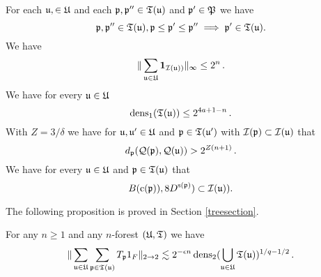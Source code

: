 For each $\mathfrak u, \in \mathfrak U$ and each $\mathfrak p,\mathfrak p''\in \mathfrak T(\mathfrak u)$ and $\mathfrak p'\in \mathfrak P$
we have
\begin{equation}\label{forest2}
    \mathfrak p, \mathfrak p'' \in \mathfrak{T}(\mathfrak u), \mathfrak p \leq \mathfrak p' \leq \mathfrak p'' \implies \mathfrak p' \in \mathfrak{T}(\mathfrak u).
\end{equation}
We have
\begin{equation}\label{forest3}
    \|\sum_{\mathfrak u\in \mathfrak U} \mathbf{1}_{\mathcal{I}(\mathfrak u))}\|_\infty \leq 2^n\,.
\end{equation}
We have for every $\mathfrak u\in \mathfrak U$
\begin{equation}\label{forest4}
\operatorname{\operatorname{dens}}_1(\mathfrak T(\mathfrak u))\le 2^{4a + 1-n}\, .
\end{equation}
With $Z=3/\delta$ we have for $\mathfrak u, \mathfrak u'\in \mathfrak U$ and $\mathfrak p\in \mathfrak T(\mathfrak u')$ with $\mathcal{I}(\mathfrak p)\subset \mathcal{I}(\mathfrak u)$ that
\begin{equation}\label{forest5}
d_{\mathfrak p}(\mathcal{Q}(\mathfrak p), \mathcal{Q}(\mathfrak u))>2^{Z(n+1)}\, .
\end{equation}
We have for every $\mathfrak u\in \mathfrak U$ and $\mathfrak p\in \mathfrak T(\mathfrak u)$ that
\begin{equation}\label{forest6}
B(\mathrm{c}(\mathfrak p)), 8D^{\mathrm{s}(\mathfrak p)})\subset \mathcal{I}(\mathfrak u)).
\end{equation}








The following proposition is proved in Section \ref{treesection}.
\begin{prop}\label{forestprop}
For any $n\ge 1$ and any $n$-forest $(\mathfrak U,\mathfrak T)$ we have
$$\|\sum_{\mathfrak u\in \mathfrak U}
\sum_{\mathfrak p\in \mathfrak T(\mathfrak u)} T_{\mathfrak p} 1_F\|_{2\to 2}
\lesssim 2^{-\epsilon n}
\operatorname{\operatorname{dens}}_2(\bigcup_{\mathfrak u\in \mathfrak U}\mathfrak T(\mathfrak u))^{1/q-1/2} \, .$$
\end{prop}

